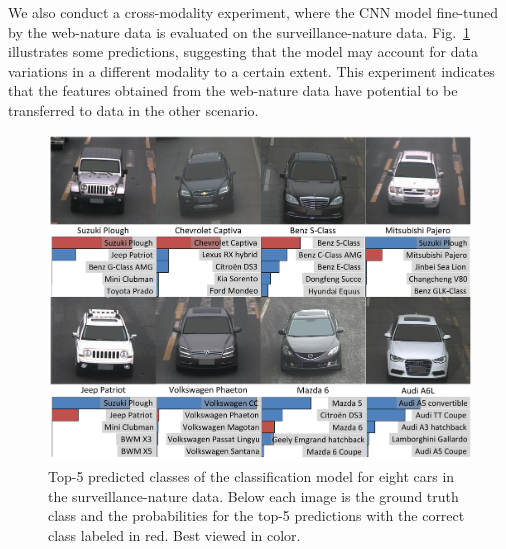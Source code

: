 \documentclass[10pt,twocolumn,letterpaper]{article}
\begin{document}
We also conduct a cross-modality experiment, where the CNN model fine-tuned by the web-nature data is evaluated on the surveillance-nature data. Fig.~\ref{fig:cross_t5} illustrates some predictions, suggesting that the model may account for data variations in a different modality to a certain extent.
%
This experiment indicates that the features obtained from the web-nature data have potential to be transferred to data in the other scenario.


\begin{figure}[t]\centering
\includegraphics[width=1\linewidth]{cross_t5.pdf}
\caption{Top-5 predicted classes of the classification model for eight cars in the surveillance-nature data. Below each image is the ground truth class and the probabilities for the top-5 predictions with the correct class labeled in red. Best viewed in color.}
\label{fig:cross_t5}
\vspace{-3pt}
\end{figure}
\end{document}
